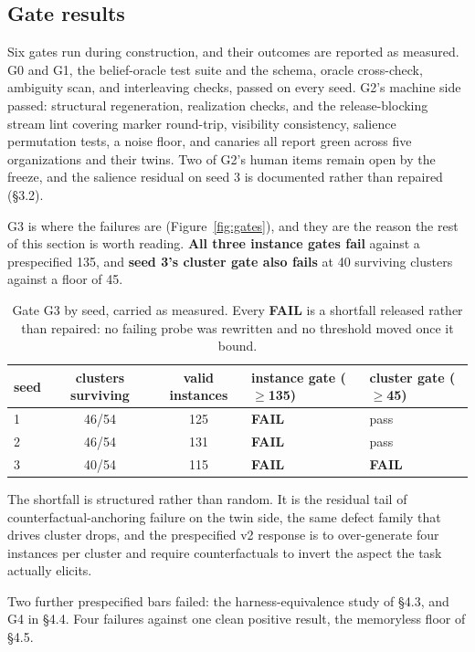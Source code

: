 \documentclass[11pt]{article}
\begin{document}
\subsection{Gate results}

Six gates run during construction, and their outcomes are reported as measured.
G0 and G1, the belief-oracle test suite and the schema, oracle cross-check,
ambiguity scan, and interleaving checks, passed on every seed. G2's machine side
passed: structural regeneration, realization checks, and the release-blocking
stream lint covering marker round-trip, visibility consistency, salience
permutation tests, a noise floor, and canaries all report green across five
organizations and their twins. Two of G2's human items remain open by the freeze,
and the salience residual on seed 3 is documented rather than repaired (\S3.2).

G3 is where the failures are (Figure~\ref{fig:gates}), and they are the reason
the rest of this section is worth reading. \textbf{All three instance gates
fail} against a prespecified 135, and \textbf{seed 3's cluster gate also fails}
at 40 surviving clusters against a floor of 45.

\begin{table}[htb]
\centering\small
\caption{Gate G3 by seed, carried as measured. Every \textbf{FAIL} is a shortfall
released rather than repaired: no failing probe was rewritten and no threshold
moved once it bound.}
\label{tab:gates}
\begin{tabular}{lccll}
\toprule
seed & clusters surviving & valid instances & instance gate ($\geq$135) & cluster gate ($\geq$45)\\
\midrule
1 & 46/54 & 125 & \textbf{FAIL} & pass\\
2 & 46/54 & 131 & \textbf{FAIL} & pass\\
3 & 40/54 & 115 & \textbf{FAIL} & \textbf{FAIL}\\
\bottomrule
\end{tabular}
\end{table}

The shortfall is structured rather than random. It is the residual tail of
counterfactual-anchoring failure on the twin side, the same defect family that
drives cluster drops, and the prespecified v2 response is to over-generate four
instances per cluster and require counterfactuals to invert the aspect the task
actually elicits.

Two further prespecified bars failed: the harness-equivalence study of \S4.3, and
G4 in \S4.4. Four failures against one clean positive result, the memoryless
floor of \S4.5.
\end{document}
